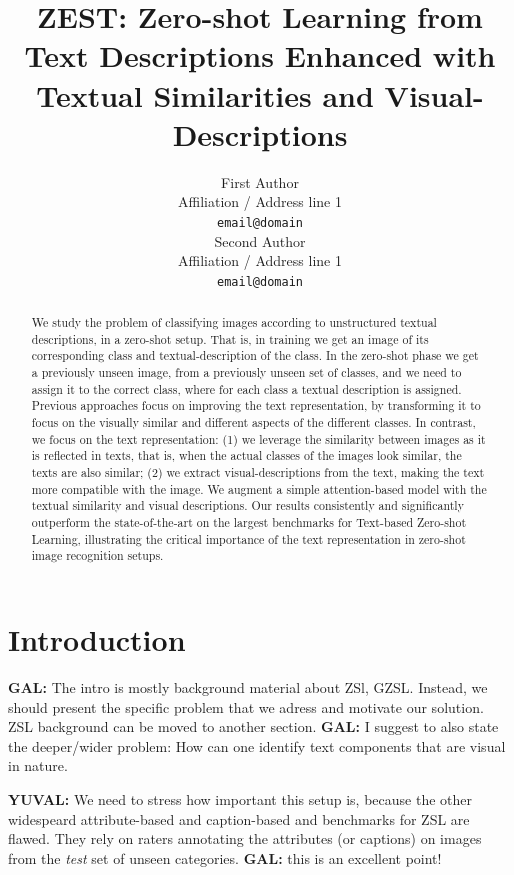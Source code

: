 \documentclass[11pt,a4paper]{article}
\title{ZEST:  Zero-shot Learning from Text Descriptions Enhanced with Textual Similarities and Visual-Descriptions}
\author{First Author \\
  Affiliation / Address line 1 \\
  \texttt{email@domain} \\\And
  Second Author \\
  Affiliation / Address line 1 \\
  \texttt{email@domain} \\}
\date{}
\newcommand\gal[1]{\textcolor{bright}{\textbf{GAL:} #1 }}
\newcommand\yuval[1]{\textcolor{darkpink}{\textbf{YUVAL:} #1 }}
\begin{document}
\maketitle
\begin{abstract}








We study the problem of classifying images according to unstructured textual descriptions, in a zero-shot setup. That is, in training we get an image of its corresponding class and textual-description of the class. In the zero-shot phase we get a previously unseen image, from a previously unseen set of classes, and we need to assign it to the correct class, where for each class a textual description is assigned.
Previous approaches focus on improving the text representation, by transforming it to focus on the visually similar and different aspects of the different classes. In contrast, we focus on the text representation: (1) we leverage the similarity between images as it is reflected in texts, that is, when the actual classes of the images look similar, the texts are also similar; (2) we extract visual-descriptions from the text, making the text more compatible with the image.
We augment a simple attention-based model with the textual similarity and visual descriptions. 
Our results consistently and significantly outperform the state-of-the-art on the largest benchmarks for Text-based Zero-shot Learning, illustrating the critical importance of the text representation in zero-shot image recognition setups. 

\end{abstract}




\section{Introduction}
\gal{The intro is mostly background material about ZSl, GZSL. Instead, we should present the specific problem that we adress and motivate our solution. ZSL background can be moved to another section.}
\gal{I suggest to also state the deeper/wider problem: How can one  identify text components that are visual in nature.}

\yuval{We need to stress how important this setup is, because the other widespeard attribute-based and caption-based and benchmarks for ZSL are flawed. They rely on raters annotating the attributes (or captions) on images from the \textit{test} set of unseen categories.}\gal{this is an excellent point! }
\end{document}
